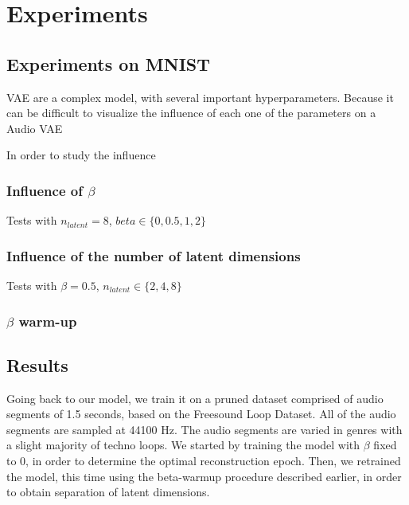 \documentclass{article}
\begin{document}
\section{Experiments}
\subsection{Experiments on MNIST}

VAE are a complex model, with several important hyperparameters. Because it can be difficult to visualize the influence of each one of the parameters on a Audio VAE

In order to study the influence 

\subsubsection{Influence of $\beta$}

Tests with $n_{latent} = 8$, $beta \in \{0, 0.5, 1, 2\}$

\subsubsection{Influence of the number of latent dimensions}

Tests with $\beta=0.5$, $n_{latent} \in \{2, 4, 8\}$

\subsubsection{$\beta$ warm-up}





\subsection{Results}




Going back to our model, we train it on a pruned dataset comprised of audio segments of 1.5 seconds, based on the Freesound Loop Dataset\cite{ramires2020}. All of the audio segments are sampled at 44100 Hz. The audio segments are varied in genres with a slight majority of techno loops.
We started by training the model with $\beta$ fixed to 0, in order to determine the optimal reconstruction epoch. Then, we retrained the model, this time using the beta-warmup procedure described earlier, in order to obtain separation of latent dimensions.
\end{document}
